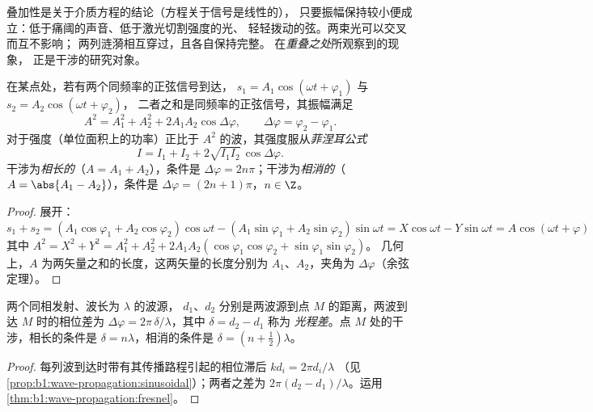 \begin{remark}[线性]\label{rem:b1:wave-propagation:linearity}
叠加性是关于介质方程的结论（方程关于信号是线性的），
只要振幅保持较小便成立：低于痛阈的声音、低于激光切割强度的光、
轻轻拨动的弦。两束光可以交叉而互不影响；
两列涟漪相互穿过，且各自保持完整。
在\emph{重叠之处}所观察到的现象，
正是干涉的研究对象。
\end{remark}

\begin{theorem}[同频率的两个正弦信号]\label{thm:b1:wave-propagation:fresnel}
在某点处，若有两个同频率的正弦信号到达，
$s_1 = A_1\cos(\omega t + \varphi_1)$ 与 $s_2 = A_2\cos(\omega t + \varphi_2)$，
二者之和是同频率的正弦信号，其振幅满足
\[
A^2 = A_1^2 + A_2^2 + 2A_1A_2\cos\Delta\varphi,
\qquad \Delta\varphi = \varphi_2 - \varphi_1 .
\]
对于强度（单位面积上的功率）正比于
$A^2$ 的波，其强度服从\emph{菲涅耳公式}
\[
I = I_1 + I_2 + 2\sqrt{I_1 I_2}\,\cos\Delta\varphi .
\]
干涉为\emph{相长的}（$A = A_1 + A_2$），条件是
$\Delta\varphi = 2n\pi$；干涉为\emph{相消的}（$A = \abs{A_1 - A_2}$），条件是
$\Delta\varphi = (2n + 1)\pi$，$n \in \Z$。
\end{theorem}

\begin{proof}
展开：$s_1 + s_2 = (A_1\cos\varphi_1 + A_2\cos\varphi_2)\cos\omega t -
(A_1\sin\varphi_1 + A_2\sin\varphi_2)\sin\omega t = X\cos\omega t -
Y\sin\omega t = A\cos(\omega t + \varphi)$ 其中 $A^2 = X^2 + Y^2 =
A_1^2 + A_2^2 + 2A_1A_2(\cos\varphi_1\cos\varphi_2 + \sin\varphi_1\sin\varphi_2)$。
几何上，$A$ 为两矢量之和的长度，这两矢量的长度分别为
$A_1$、$A_2$，夹角为 $\Delta\varphi$（余弦定理）。
\end{proof}

\begin{proposition}\label{prop:b1:wave-propagation:pathdiff}
两个同相发射、波长为 $\lambda$ 的波源，
$d_1$、$d_2$ 分别是两波源到点 $M$ 的距离，两波到达 $M$ 时的相位差为
$\Delta\varphi = 2\pi\,\delta/\lambda$，其中 $\delta = d_2 - d_1$ 称为
\emph{光程差}。点 $M$ 处的干涉，相长的条件是
$\delta = n\lambda$，相消的条件是 $\delta = (n + \tfrac12)\lambda$。
\end{proposition}

\begin{proof}
每列波到达时带有其传播路程引起的相位滞后 $kd_i = 2\pi d_i/\lambda$
（见\cref{prop:b1:wave-propagation:sinusoidal}）；两者之差为
$2\pi(d_2 - d_1)/\lambda$。运用\cref{thm:b1:wave-propagation:fresnel}。
\end{proof}

